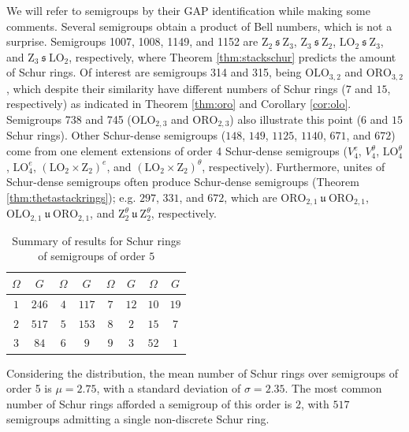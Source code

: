\documentclass{article}
\theoremstyle{plain}
\theoremstyle{definition}
\newcommand{\thmref}[1]{Theorem \ref{#1}}
\newcommand{\corref}[1]{Corollary \ref{#1}}
\newcommand{\LO}{\mathrm{LO}}
\newcommand{\ORO}{\mathrm{ORO}}
\newcommand{\OLO}{\mathrm{OLO}}
\newcommand{\z}{\mathrm{Z}}
\newcommand{\s}{\ \mathfrak{s}\ }
\renewcommand{\u}{\ \mathfrak{u}\ }
\begin{document}
We will refer to semigroups by their GAP identification while making some comments. Several semigroups obtain a product of Bell numbers, which is not a surprise. Semigroups 1007, 1008, 1149, and 1152 are $\z_2 \s \z_3$, $\z_3 \s \z_2$, $\LO_2\s\z_3$, and $\z_3\s\LO_2$, respectively, where Theorem \ref{thm:stackschur} predicts the amount of Schur rings. Of interest are semigroups 314 and 315, being $\OLO_{3,2}$ and $\ORO_{3,2}$, which despite their similarity have different numbers of Schur rings ($7$ and $15$, respectively) as indicated in \thmref{thm:oro} and \corref{cor:olo}. Semigroups 738 and 745 ($\OLO_{2,3}$ and $\ORO_{2,3}$) also illustrate this point ($6$ and $15$ Schur rings). Other Schur-dense semigroups ($148$, $149$, $1125$, $1140$, $671$, and $672$) come from one element extensions of order 4 Schur-dense semigroups ($V_4^e$, $V_4^\theta$, $\LO_4^\theta$, $\LO_4^e$, $(\LO_2\times \z_2)^e$, and $(\LO_2\times \z_2)^\theta$, respectively). Furthermore, unites of Schur-dense semigroups often produce Schur-dense semigroups (\thmref{thm:thetastackrings}); e.g. $297$, $331$, and $672$, which are $\ORO_{2, 1}\u\ORO_{2,1}$, $\OLO_{2,1}\u\ORO_{2,1}$, and $\z_2^\theta\u \z_2^\theta$, respectively. 

\begin{table}[!ht]
\begin{center}
\begin{tabular}{cc|cc|cc|cc}
$\Omega$ & $G$ & $\Omega$ & $G$ & $\Omega$ & $G$ & $\Omega$ & $G$ \\
\hline
$1$ & $246$ & $4$ & $117$ & $7$ & $12$ & $10$ & $19$\\
 $2$ &$517$ & $5$ & $153$ & $8$ & $2$  & $15$ & $7$\\
 $3$ &$84$  & $6$ & $9$   & $9$ & $3$  & $52$ & $1$
\end{tabular}
\caption{Summary of results for Schur rings of semigroups of order $5$}
\label{fig:sgsr5}
\end{center}
\end{table}

Considering the distribution, the mean number of Schur rings over semigroups of order 5 is $\mu=2.75$, %
with a standard deviation of $\sigma=2.35.$ %
The most common number of Schur rings afforded a semigroup of this order is $2$, with $517$ semigroups admitting a single non-discrete Schur ring.
\end{document}
